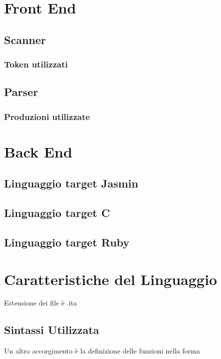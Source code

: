 \documentclass[11pt, a4paper, twoside, notitlepage]{report}
\begin{document}
\onehalfspacing

\setcounter{page}{1}
\setcounter{tocdepth}{3}%
\tableofcontents

\chapter{Front End}

\section{Scanner}
\subsection{Token utilizzati} 
\section{Parser}
\subsection{Produzioni utilizzate}

\chapter{Back End}
\label{back_end}
\section{Linguaggio target Jasmin}
\section{Linguaggio target C}
\section{Linguaggio target Ruby}

\chapter{Caratteristiche del Linguaggio}
Estensione dei file è .ita
\section{Sintassi Utilizzata}
\label{sintassi}
Un altro accorgimento è la definizione delle funzioni nella forma
\end{document}
